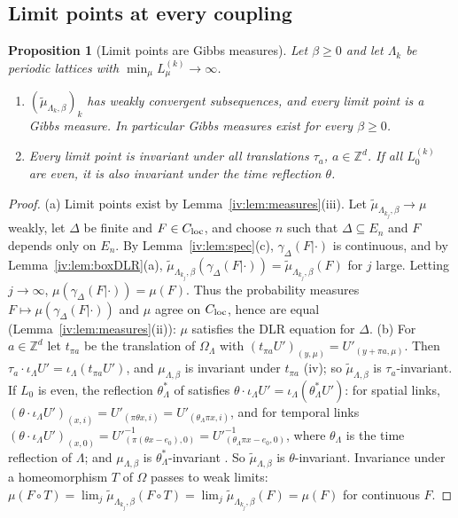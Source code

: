 \documentclass[11pt,a4paper]{article}
\newtheorem{proposition}[theorem]{Proposition}
\theoremstyle{definition}
\theoremstyle{remark}
\newcommand{\Z}{\mathbb{Z}}
\newcommand{\Flab}[2]{\cite[#1 \texttt{#2}]{F}}
\newcommand{\Fname}[2]{\cite[#1~`#2']{F}}
\begin{document}
\subsection{Limit points at every coupling}

\begin{proposition}[Limit points are Gibbs measures]\label{iv:prop:limitpoints}
Let $\beta\ge0$ and let $\Lambda_k$ be periodic lattices with $\min_\mu L_\mu^{(k)}\to\infty$.
\begin{enumerate}[label=(\alph*)]
\item $(\tilde\mu_{\Lambda_k,\beta})_k$ has weakly convergent subsequences, and every limit point is a Gibbs measure. In
particular Gibbs measures exist for every $\beta\ge0$.
\item Every limit point is invariant under all translations $\tau_a$, $a\in\Z^d$. If all $L_0^{(k)}$ are even, it is also
invariant under the time reflection $\theta$.
\end{enumerate}
\end{proposition}

\begin{proof}
(a) Limit points exist by Lemma~\ref{iv:lem:measures}(iii). Let $\tilde\mu_{\Lambda_{k_j},\beta}\to\mu$ weakly, let $\Delta$ be
finite and $F\in C_{\rm loc}$, and choose $n$ such that $\Delta\subseteq E_n$ and $F$ depends only on $E_n$. By
Lemma~\ref{iv:lem:spec}(c), $\gamma_\Delta(F|\cdot)$ is continuous, and by Lemma~\ref{iv:lem:boxDLR}(a),
$\tilde\mu_{\Lambda_{k_j},\beta}(\gamma_\Delta(F|\cdot))=\tilde\mu_{\Lambda_{k_j},\beta}(F)$ for $j$ large. Letting $j\to\infty$,
$\mu(\gamma_\Delta(F|\cdot))=\mu(F)$. Thus the probability measures $F\mapsto\mu(\gamma_\Delta(F|\cdot))$ and $\mu$ agree on
$C_{\rm loc}$, hence are equal (Lemma~\ref{iv:lem:measures}(ii)): $\mu$ satisfies the DLR equation for $\Delta$.
(b) For $a\in\Z^d$ let $t_{\pi a}$ be the translation of $\Omega_\Lambda$ with $(t_{\pi a}U')_{(y,\mu)}=U'_{(y+\pi a,\mu)}$. Then
$\tau_a\cdot\iota_\Lambda U'=\iota_\Lambda(t_{\pi a}U')$, and $\mu_{\Lambda,\beta}$ is invariant under $t_{\pi a}$
\Flab{Theorem}{thm:basic}(iv); so $\tilde\mu_{\Lambda,\beta}$ is $\tau_a$-invariant. If $L_0$ is even, the reflection $\theta^*_\Lambda$
of \Fname{Section}{Reflection positivity} satisfies $\theta\cdot\iota_\Lambda U'=\iota_\Lambda(\theta^*_\Lambda U')$: for spatial links,
$(\theta\cdot\iota_\Lambda U')_{(x,i)}=U'_{(\pi\theta x,i)}=U'_{(\theta_\Lambda\pi x,i)}$, and for temporal links
$(\theta\cdot\iota_\Lambda U')_{(x,0)}=U'^{-1}_{(\pi(\theta x-e_0),0)}=U'^{-1}_{(\theta_\Lambda\pi x-e_0,0)}$, where $\theta_\Lambda$ is the
time reflection of $\Lambda$; and $\mu_{\Lambda,\beta}$ is $\theta^*_\Lambda$-invariant \Flab{Lemma}{lem:reflsym}. So
$\tilde\mu_{\Lambda,\beta}$ is $\theta$-invariant. Invariance under a homeomorphism $T$ of $\Omega$ passes to weak limits:
$\mu(F\circ T)=\lim_j\tilde\mu_{\Lambda_{k_j},\beta}(F\circ T)=\lim_j\tilde\mu_{\Lambda_{k_j},\beta}(F)=\mu(F)$ for continuous $F$.
\end{proof}
\end{document}
